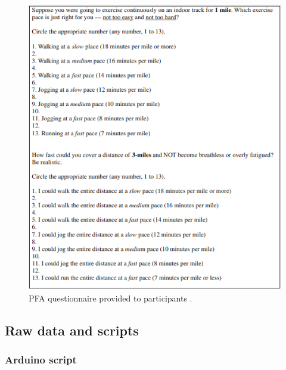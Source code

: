 \documentclass{article}
\begin{document}
\begin{figure}[h!]
\centering
\includegraphics[width=0.8\linewidth]{pics/pfa.png}
\caption{PFA questionnaire provided to participants \parencite{akay2009}.}
\end{figure}

\pagebreak
\subsection{Raw data and scripts}

\subsubsection{Arduino script}
\end{document}
